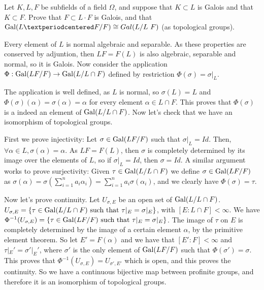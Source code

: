 \begin{ex}
	Let $K, L, F$ be subfields of a field $\Omega$, and suppose that $K \subset L$ is Galois and that $K \subset F$. Prove that $F \subset L · F$ is Galois, and that $\Gal(L · F/F) \cong  Gal(L/L \ F)$ (as topological groups).
\end{ex}

\begin{sol}
	Every element of $L$ is normal algebraic and separable. As these properties are conserved by adjuntion, then $LF = F(L)$ is also algebraic, separable and normal, so it is Galois. Now consider the application $\Phi: \mathrm{Gal}(LF/F) \to \mathrm{Gal}(L/L\cap F)$ defined by restriction $\Phi(\sigma) = \sigma|_L$.

	The application is well defined, as $L$ is normal, so $\sigma(L) = L$ and $\Phi(\sigma)(\alpha) = \sigma(\alpha) = \alpha$ for every element $\alpha \in L \cap F$. This proves that $\Phi(\sigma)$ is a indeed an element of $\mathrm{Gal}(L/L\cap F)$. Now let's check that we have an isomorphism of topological groups.

	First we prove injectivity: Let $\sigma \in \mathrm{Gal}(LF/F)$ such that $\sigma|_L = Id$. Then, $\forall \alpha \in L, \sigma(\alpha) = \alpha$. As $LF = F(L)$, then $\sigma$ is completely determined by its image over the elements of $L$, so if $\sigma|_L = Id$, then $\sigma = Id$. A similar argument works to prove surjectivity: Given $\tau \in \mathrm{Gal}(L/L \cap F)$ we define $\sigma \in \mathrm{Gal}(LF/F)$ as $\sigma(\alpha) = \sigma(\sum_{i = 1}^n a_i \alpha_i) = \sum_{i = 1}^n a_i \sigma(\alpha_i)$, and we clearly have $\Phi(\sigma) = \tau$.

	Now let's prove continuity. Let $U_{\sigma, E}$ be an open set of $\mathrm{Gal}(L/L \cap F)$. $U_{\sigma, E} = \{\tau \in \mathrm{Gal}(L/L \cap F) \text{ such that } \tau|_E = \sigma|_E\}$, with $[E:L \cap F] < \infty$. We have $\Phi^{-1}(U_{\sigma, E}) = \{ \tau \in \mathrm{Gal}(LF/F) \text{ such that } \tau|_E = \sigma|_E \}$. The image of $\tau$ on $E$ is completely determined by the image of a certain element $\alpha$, by the primitive element theorem. So let $E' = F(\alpha)$ and we have that $[E':F] < \infty$ and $\tau|_E' = \sigma'|_E'$, where $\sigma'$ is the only element of $\mathrm{Gal}(LF/F)$ such that $\Phi(\sigma') = \sigma$. This proves that $\Phi^{-1}(U_{\sigma, E}) = U_{\sigma', E'}$ which is open, and this proves the continuity. So we have a continuous bijective map between profinite groups, and therefore it is an isomorphism of topological groups.
	
\end{sol}

